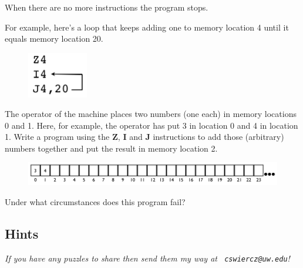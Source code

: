 \documentclass[12pt]{article}
\begin{document}
\noindent When there are no more instructions the program stops.

\pagebreak

\noindent For example, here's a loop that keeps adding one to memory location 4
until it equals memory location 20.

\begin{figure}[ht]
  \centering
  \includegraphics[width=100px]{zprogram.png}
\end{figure}

 The operator of the machine places two numbers
(one each) in memory locations 0 and 1. Here, for example, the operator has put
3 in location 0 and 4 in location 1. Write a program using the {\bf Z}, {\bf I}
and {\bf J} instructions to add those (arbitrary) numbers together and put the
result in memory location 2.

\begin{figure}[ht]
  \centering
  \includegraphics[width=\textwidth]{z34.png}
\end{figure}

 Under what circumstances does this program fail?


\subsection*{Hints}

{
\par\vspace*{\fill}
\noindent \small \it
If you have any puzzles to share then send them my way at {\tt
  cswiercz@uw.edu}!
}
\end{document}
